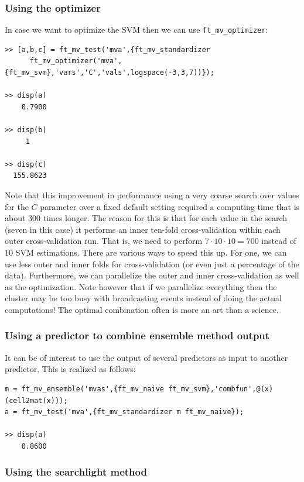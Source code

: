 \documentclass{article}
\renewcommand{\t}[1]{{\tt #1}}
\begin{document}
\subsubsection*{Using the optimizer}

In case we want to optimize the SVM then we can use \t{ft\_mv\_optimizer}:
\begin{verbatim}
>> [a,b,c] = ft_mv_test('mva',{ft_mv_standardizer 
      ft_mv_optimizer('mva',{ft_mv_svm},'vars','C','vals',logspace(-3,3,7))});

>> disp(a)
    0.7900

>> disp(b)
     1

>> disp(c)
  155.8623
\end{verbatim}
Note that this improvement in performance using a very coarse search over values for the $C$ parameter  over a fixed default setting required a computing time that is about  300 times longer. The reason for this is that for each value in the search (seven in this case) it performs an inner ten-fold cross-validation within each outer cross-validation run. That is, we need to perform $7 \cdot 10 \cdot 10=700$ instead of $10$ SVM estimations. There are various ways to speed this up. For one, we can use less outer and inner folds for cross-validation (or even just a percentage of the data). Furthermore, we can parallelize the outer and inner cross-validation as well as the optimization. Note however that if we parallelize everything then the cluster may be too busy with broadcasting events instead of doing the actual computations! The optimal combination often is more an art than a science.

\subsubsection*{Using a predictor to combine ensemble method output}
It can be of interest to use the output of several predictors as input to another predictor. This is realized as follows:
\begin{verbatim}
m = ft_mv_ensemble('mvas',{ft_mv_naive ft_mv_svm},'combfun',@(x)(cell2mat(x)));
a = ft_mv_test('mva',{ft_mv_standardizer m ft_mv_naive});

>> disp(a)
    0.8600
\end{verbatim}

\subsubsection*{Using the searchlight method}
\end{document}
